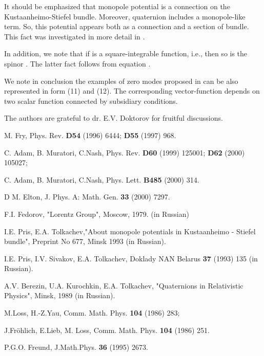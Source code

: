 \documentclass[12pt,a4paper]{article}
\begin{document}
It should be emphasized that monopole potential is a connection on the
Kustaanheimo-Stiefel bundle. Moreover, quaternion \coordHE{} includes a monopole-like term.
So, this potential appears both as a connection and a section of bundle.
This fact was investigated in more detail in \cite{Pris1}.

In addition, we note
that if \coordHE{} is a square-integrable function, i.e.,
\coordHE{} then so is the spinor \myHighlight{$\psi$}\coordHE{}. The
latter fact follows from equation \coordHE{}.

We note in conclusion the examples of zero modes proposed in \cite{Elton} can
be also represented in form (11) and (12). The corresponding vector-function
\coordHE{} depends on two scalar function connected by subsidiary
conditions.

The authors are grateful to dr. E.V. Doktorov for fruitful discussions.

\begin{thebibliography}{999}

  M. Fry, Phys. Rev. {\bf D54} (1996) 6444;
{\bf D55} (1997) 968.

 C. Adam, B. Muratori, C.Nash, Phys. Rev. {\bf D60} (1999)
125001; {\bf D62} (2000) 105027;

C. Adam, B. Muratori, C.Nash, Phys. Lett. {\bf B485} (2000) 314.

 D M. Elton, J. Phys. A: Math. Gen. {\bf 33} (2000) 7297.

 F.I. Fedorov, "Lorentz Group", Moscow, 1979. (in Russian)

 I.E. Pris, E.A. Tolkachev,"About monopole potentials in
Kustaanheimo - Stiefel bundle", Preprint No 677, Minsk 1993 (in Russian).

 I.E. Pris, I.V. Sivakov, E.A. Tolkachev, Doklady  NAN
Belarus {\bf 37} (1993) 135 (in Russian).

 A.V. Berezin, U.A. Kurochkin, E.A. Tolkachev, "Quaternions in
Relativistic Physics", Minsk, 1989 (in Russian).

 M.Loss, H.-Z.Yau, Comm. Math. Phys. {\bf 104} (1986) 283;

J.Fr\"ohlich, E.Lieb, M. Loss, Comm. Math. Phys. {\bf 104} (1986) 251.

 P.G.O. Freund, J.Math.Phys. {\bf 36}  (1995) 2673.
\end{thebibliography}
\end{document}
